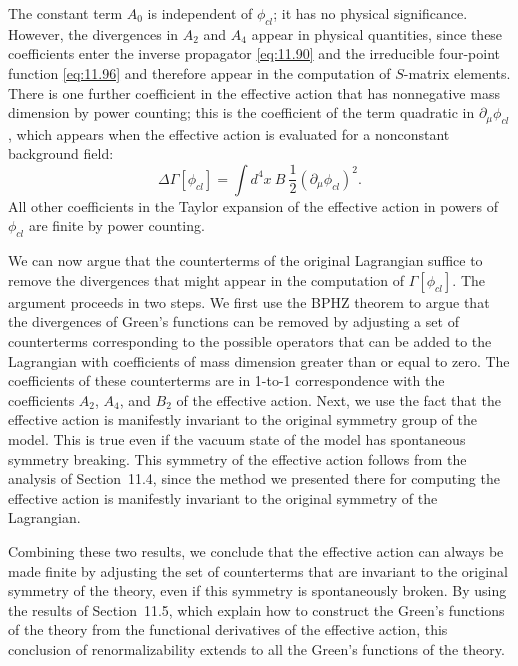 The constant term $A_0$ is independent of $\phi_{cl}$; it has no physical
significance.  However, the divergences in $A_2$ and $A_4$ appear in physical
quantities, since these coefficients enter the inverse propagator
\eqref{eq:11.90} and the irreducible four-point function \eqref{eq:11.96} and
therefore appear in the computation of $S$-matrix elements.  There is one
further coefficient in the effective action that has nonnegative mass
dimension by power counting; this is the coefficient of the term quadratic in
$\partial_\mu\phi_{cl}$, which appears when the effective action is evaluated
for a nonconstant background field:
\begin{equation}
  \Delta\Gamma[\phi_{cl}] = \int d^4x\ B\ \frac{1}{2}(\partial_\mu\phi_{cl})^2 .
  \label{eq:11.98}
\end{equation}
All other coefficients in the Taylor expansion of the effective action in
powers of $\phi_{cl}$ are finite by power counting.

We can now argue that the counterterms of the original Lagrangian suffice to
remove the divergences that might appear in the computation of
$\Gamma[\phi_{cl}]$.  The argument proceeds in two steps.  We first use the
BPHZ theorem to argue that the divergences of Green's functions can be removed
by adjusting a set of counterterms corresponding to the possible operators
that can be added to the Lagrangian with coefficients of mass dimension
greater than or equal to zero.  The coefficients of these counterterms are in
1-to-1 correspondence with the coefficients $A_2$, $A_4$, and $B_2$ of the
effective action.  Next, we use the fact that the effective action is
manifestly invariant to the original symmetry group of the model.  This is
true even if the vacuum state of the model has spontaneous symmetry breaking.
This symmetry of the effective action follows from the analysis of
Section~11.4, since the method we presented there for computing the effective
action is manifestly invariant to the original symmetry of the Lagrangian.

Combining these two results, we conclude that the effective action can always
be made finite by adjusting the set of counterterms that are invariant to the
original symmetry of the theory, even if this symmetry is spontaneously
broken.  By using the results of Section~11.5, which explain how to construct
the Green's functions of the theory from the functional derivatives of the
effective action, this conclusion of renormalizability extends to all the
Green's functions of the theory.


